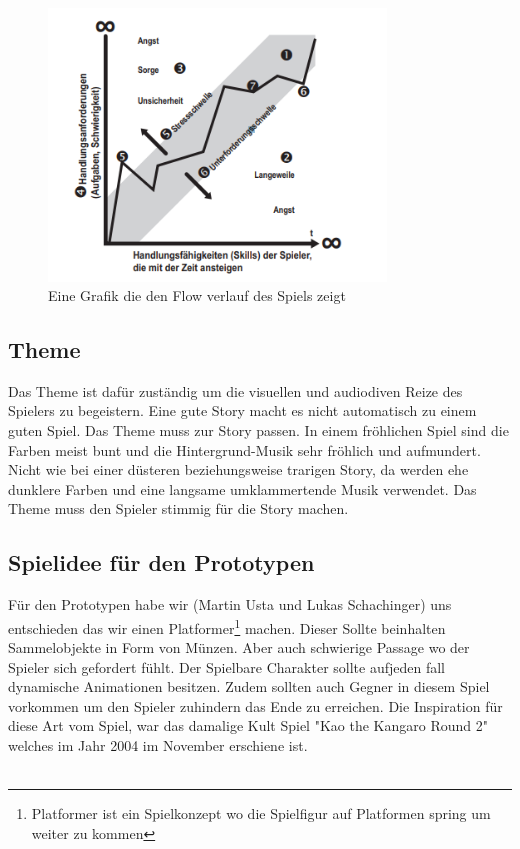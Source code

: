 \begin{figure}[H]
    \centering
    \includegraphics[width=0.8\textwidth]{chapters/15/images/GameFlow.png}
    \caption{Eine Grafik die den Flow verlauf des Spiels zeigt}
    \label{UST-4}
\end{figure}


\subsection{Theme}
Das Theme ist dafür zuständig um die visuellen und audiodiven Reize des Spielers zu begeistern. Eine gute Story macht es nicht automatisch zu einem guten Spiel. Das Theme muss zur Story passen. In einem fröhlichen Spiel sind die Farben meist bunt und die Hintergrund-Musik sehr fröhlich und aufmundert. Nicht wie bei einer düsteren beziehungsweise trarigen Story, da werden ehe dunklere Farben und eine langsame umklammertende Musik verwendet. Das Theme muss den Spieler stimmig für die Story machen.

\subsection{Spielidee für den Prototypen}
Für den Prototypen habe wir (Martin Usta und Lukas Schachinger) uns entschieden das wir einen Platformer\footnote[6]{Platformer ist ein Spielkonzept wo die Spielfigur auf Platformen spring um weiter zu kommen} machen. Dieser Sollte beinhalten Sammelobjekte in Form von Münzen. Aber auch schwierige Passage wo der Spieler sich gefordert fühlt. Der Spielbare Charakter sollte aufjeden fall dynamische Animationen besitzen. Zudem sollten auch Gegner in diesem Spiel vorkommen um den Spieler zuhindern das Ende zu erreichen. Die Inspiration für diese Art vom Spiel, war das damalige Kult Spiel "Kao the Kangaro Round 2" welches im Jahr 2004 im November erschiene ist.\\\\

